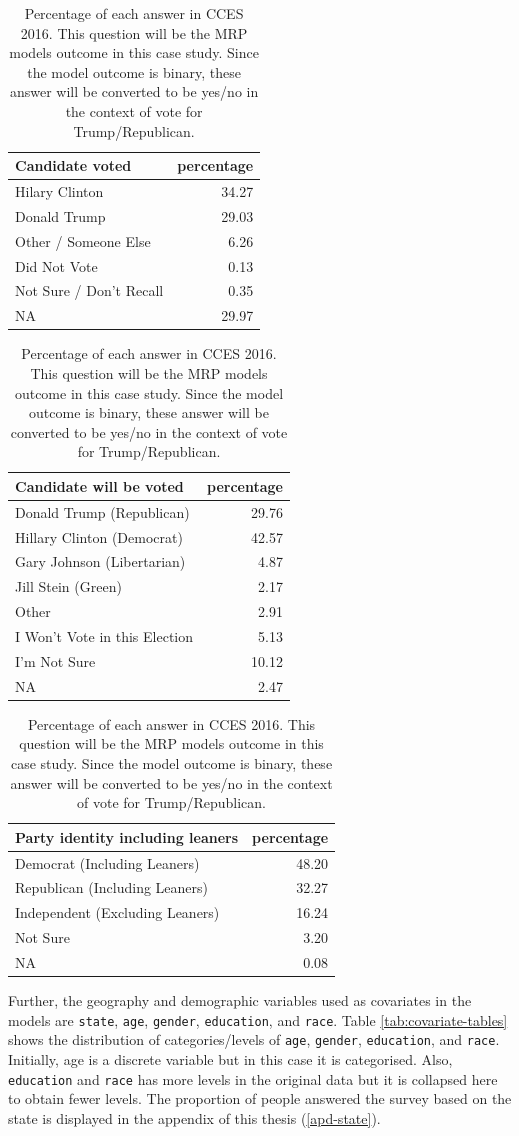 \documentclass{monashthesis}
\begin{document}
\begin{table}
\caption{\label{tab:outcome-table}Percentage of each answer in CCES 2016. This question will be the MRP models outcome in this case study. Since the model outcome is binary, these answer will be converted to be yes/no in the context of vote for Trump/Republican.}

\centering
\begin{tabular}[t]{lr}
\toprule
Candidate voted & percentage\\
\midrule
Hilary Clinton & 34.27\\
Donald Trump & 29.03\\
Other / Someone Else & 6.26\\
Did Not Vote & 0.13\\
Not Sure / Don't Recall & 0.35\\
\addlinespace
NA & 29.97\\
\bottomrule
\end{tabular}
\centering
\begin{tabular}[t]{lr}
\toprule
Candidate will be voted & percentage\\
\midrule
Donald Trump (Republican) & 29.76\\
Hillary Clinton (Democrat) & 42.57\\
Gary Johnson (Libertarian) & 4.87\\
Jill Stein (Green) & 2.17\\
Other & 2.91\\
\addlinespace
I Won't Vote in this Election & 5.13\\
I'm Not Sure & 10.12\\
NA & 2.47\\
\bottomrule
\end{tabular}
\centering
\begin{tabular}[t]{lr}
\toprule
Party identity including leaners & percentage\\
\midrule
Democrat (Including Leaners) & 48.20\\
Republican (Including Leaners) & 32.27\\
Independent (Excluding Leaners) & 16.24\\
Not Sure & 3.20\\
NA & 0.08\\
\bottomrule
\end{tabular}
\end{table}

Further, the geography and demographic variables used as covariates in the models are \texttt{state}, \texttt{age}, \texttt{gender}, \texttt{education}, and \texttt{race}. Table \ref{tab:covariate-tables} shows the distribution of categories/levels of \texttt{age}, \texttt{gender}, \texttt{education}, and \texttt{race}. Initially, age is a discrete variable but in this case it is categorised. Also, \texttt{education} and \texttt{race} has more levels in the original data but it is collapsed here to obtain fewer levels. The proportion of people answered the survey based on the state is displayed in the appendix of this thesis (\ref{apd-state}).
\end{document}
